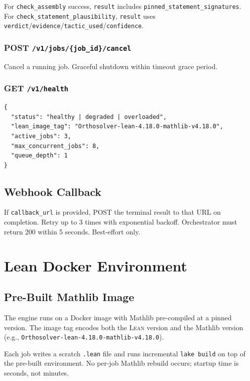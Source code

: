 \documentclass[11pt,a4paper]{article}
\newcommand{\Lean}{\textsc{Lean}}
\begin{document}
For \texttt{check\_assembly} success, \texttt{result} includes \texttt{pinned\_statement\_signatures}. For \texttt{check\_statement\_plausibility}, \texttt{result} uses \texttt{verdict}/\texttt{evidence}/\texttt{tactic\_used}/\texttt{confidence}.

\subsubsection{POST \texttt{/v1/jobs/\{job\_id\}/cancel}}
Cancel a running job. Graceful shutdown within timeout grace period.

\subsubsection{GET \texttt{/v1/health}}
\begin{lstlisting}
{
  "status": "healthy | degraded | overloaded",
  "lean_image_tag": "Orthosolver-lean-4.18.0-mathlib-v4.18.0",
  "active_jobs": 3,
  "max_concurrent_jobs": 8,
  "queue_depth": 1
}
\end{lstlisting}

\subsection{Webhook Callback}
If \texttt{callback\_url} is provided, POST the terminal result to that URL on completion. Retry up to 3 times with exponential backoff. Orchestrator must return 200 within 5 seconds. Best-effort only.

\section{Lean Docker Environment}

\subsection{Pre-Built Mathlib Image}

The engine runs on a Docker image with Mathlib pre-compiled at a pinned version. The image tag encodes both the \Lean{} version and the Mathlib version (e.g., \texttt{Orthosolver-lean-4.18.0-mathlib-v4.18.0}).

Each job writes a scratch \texttt{.lean} file and runs incremental \texttt{lake build} on top of the pre-built environment. No per-job Mathlib rebuild occurs; startup time is seconds, not minutes.
\end{document}
